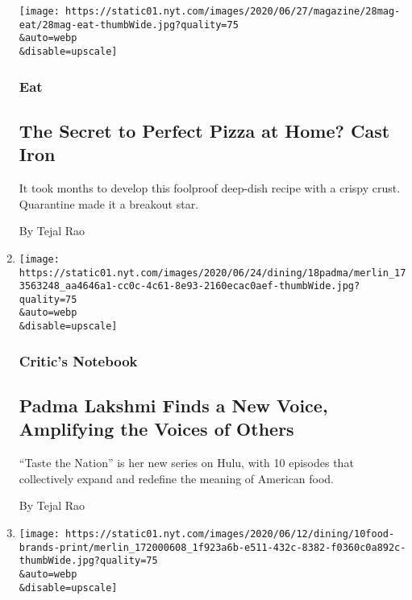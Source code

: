 \begin{enumerate}
  \texttt{[image: https://static01.nyt.com/images/2020/06/27/magazine/28mag-eat/28mag-eat-thumbWide.jpg?quality=75\\\&auto=webp\\\&disable=upscale]}

  \hypertarget{eat-}{%
  \subsubsection{Eat }\label{eat-}}

  \hypertarget{the-secret-to-perfect-pizza-at-home-cast-iron}{%
  \subsection{The Secret to Perfect Pizza at Home? Cast
  Iron}\label{the-secret-to-perfect-pizza-at-home-cast-iron}}

  It took months to develop this foolproof deep-dish recipe with a
  crispy crust. Quarantine made it a breakout star.

  By Tejal Rao
\item
  \href{/2020/06/18/dining/padma-lakshmi-taste-the-nation.html}{}

  \texttt{[image: https://static01.nyt.com/images/2020/06/24/dining/18padma/merlin\_173563248\_aa4646a1-cc0c-4c61-8e93-2160ecac0aef-thumbWide.jpg?quality=75\\\&auto=webp\\\&disable=upscale]}

  \hypertarget{critics-notebook-2}{%
  \subsubsection{Critic's Notebook}\label{critics-notebook-2}}

  \hypertarget{padma-lakshmi-finds-a-new-voice-amplifying-the-voices-of-others}{%
  \subsection{Padma Lakshmi Finds a New Voice, Amplifying the Voices of
  Others}\label{padma-lakshmi-finds-a-new-voice-amplifying-the-voices-of-others}}

  ``Taste the Nation'' is her new series on Hulu, with 10 episodes that
  collectively expand and redefine the meaning of American food.

  By Tejal Rao
\item
  \href{/2020/06/11/dining/food-brands-black-lives-matter-social-media.html}{}

  \texttt{[image: https://static01.nyt.com/images/2020/06/12/dining/10food-brands-print/merlin\_172000608\_1f923a6b-e511-432c-8382-f0360c0a892c-thumbWide.jpg?quality=75\\\&auto=webp\\\&disable=upscale]}


\end{enumerate}
